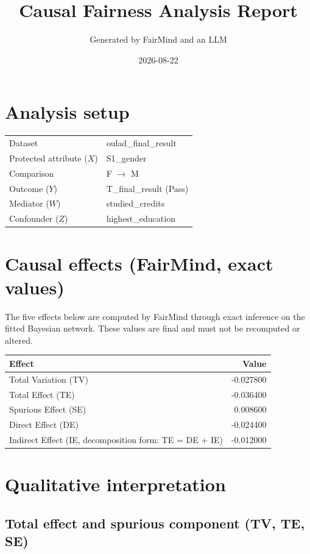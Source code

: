 \documentclass[11pt]{article}
\title{Causal Fairness Analysis Report}
\author{Generated by FairMind and an LLM}
\date{2026-08-22}
\begin{document}
\maketitle

\section{Analysis setup}

\begin{tabular}{ll}
\toprule
Dataset & oulad\_final\_result \\
Protected attribute ($X$) & S1\_gender \\
Comparison & F $\to$ M \\
Outcome ($Y$) & T\_final\_result (Pass) \\
Mediator ($W$) & studied\_credits \\
Confounder ($Z$) & highest\_education \\
\bottomrule
\end{tabular}

\section{Causal effects (FairMind, exact values)}

The five effects below are computed by FairMind through exact inference on the
fitted Bayesian network. These values are final and must not be recomputed or
altered.

\begin{tabular}{lr}
\toprule
Effect & Value \\
\midrule
Total Variation (TV) & -0.027800 \\
Total Effect (TE) & -0.036400 \\
Spurious Effect (SE) & 0.008600 \\
Direct Effect (DE) & -0.024400 \\
Indirect Effect (IE, decomposition form: TE = DE + IE) & -0.012000 \\
\bottomrule
\end{tabular}

\section{Qualitative interpretation}

\subsection{Total effect and spurious component (TV, TE, SE)}
\end{document}
